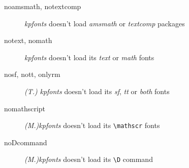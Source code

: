 \documentclass[a4paper,11pt]{christophe}
\begin{document}
\begin{description}
  \item[noamsmath, notextcomp]\textit{kpfonts} doesn't load \textit{amsmath} or \textit{textcomp} packages
  \item[notext, nomath]\textit{kpfonts} doesn't load its \textit{text} or \textit{math} fonts
  \item[nosf, nott, onlyrm]\textit{(T.)}\quad 
       \textit{kpfonts} doesn't load its \textit{sf}, \textit{tt} or \textit{both} fonts
  \item[nomathscript]\textit{(M.)}\quad\textit{kpfonts} doesn't load its \verb=\mathscr= fonts
  \item[noDcommand]\textit{(M.)}\quad\textit{kpfonts} doesn't load its \verb=\D= command
\end{description}

\vfill\vfill\vfill
{}
\end{document}
